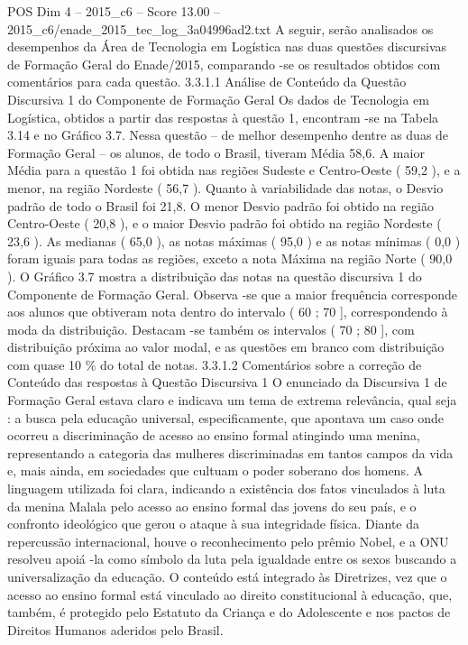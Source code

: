 \begin{textsample}{POS Dim 4 – 2015\_c6 – Score 13.00 – 2015\_c6/enade\_2015\_tec\_log\_3a04996ad2.txt}
A seguir, serão analisados os desempenhos da Área de Tecnologia em Logística nas duas questões discursivas de Formação Geral do Enade/2015, comparando -se os resultados obtidos com comentários para cada questão. 3.3.1.1 Análise de Conteúdo da Questão Discursiva 1 do Componente de Formação Geral Os dados de Tecnologia em Logística, obtidos a partir das respostas à questão 1, encontram -se na Tabela 3.14 e no Gráfico 3.7.
Nessa questão – de melhor desempenho dentre as duas de Formação Geral – os alunos, de todo o Brasil, tiveram Média 58,6.
A maior Média para a questão 1 foi obtida nas regiões Sudeste e Centro-Oeste ( 59,2 ), e a menor, na região Nordeste ( 56,7 ).
Quanto à variabilidade das notas, o Desvio padrão de todo o Brasil foi 21,8.
O menor Desvio padrão foi obtido na região Centro-Oeste ( 20,8 ), e o maior Desvio padrão foi obtido na região Nordeste ( 23,6 ).
As medianas ( 65,0 ), as notas máximas ( 95,0 ) e as notas mínimas ( 0,0 ) foram iguais para todas as regiões, exceto a nota Máxima na região Norte ( 90,0 ).
O Gráfico 3.7 mostra a distribuição das notas na questão discursiva 1 do Componente de Formação Geral.
Observa -se que a maior frequência corresponde aos alunos que obtiveram nota dentro do intervalo ( 60 ; 70 ], correspondendo à moda da distribuição.
Destacam -se também os intervalos ( 70 ; 80 ], com distribuição próxima ao valor modal, e as questões em branco com distribuição com quase 10 \% do total de notas. 3.3.1.2 Comentários sobre a correção de Conteúdo das respostas à Questão Discursiva 1 O enunciado da Discursiva 1 de Formação Geral estava claro e indicava um tema de extrema relevância, qual seja : a busca pela educação universal, especificamente, que apontava um caso onde ocorreu a discriminação de acesso ao ensino formal atingindo uma menina, representando a categoria das mulheres discriminadas em tantos campos da vida e, mais ainda, em sociedades que cultuam o poder soberano dos homens.
A linguagem utilizada foi clara, indicando a existência dos fatos vinculados à luta da menina Malala pelo acesso ao ensino formal das jovens do seu país, e o confronto ideológico que gerou o ataque à sua integridade física.
Diante da repercussão internacional, houve o reconhecimento pelo prêmio Nobel, e a ONU resolveu apoiá -la como símbolo da luta pela igualdade entre os sexos buscando a universalização da educação.
O conteúdo está integrado às Diretrizes, vez que o acesso ao ensino formal está vinculado ao direito constitucional à educação, que, também, é protegido pelo Estatuto da Criança e do Adolescente e nos pactos de Direitos Humanos aderidos pelo Brasil.

\end{textsample}
